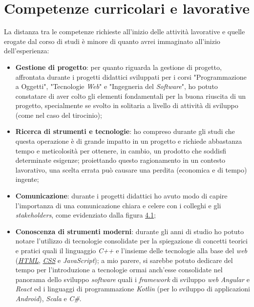 \section{Competenze curricolari e lavorative}
La distanza tra le competenze richieste all'inizio delle attività lavorative e quelle erogate dal corso di studi è minore di quanto avrei immaginato all'inizio dell'esperienza: 
\begin{itemize}
    \item \textbf{Gestione di progetto}: per quanto riguarda la gestione di progetto, affrontata durante i progetti didattici sviluppati per i corsi "Programmazione a Oggetti", "Tecnologie \textit{Web}" e "Ingegneria del \textit{Software}", 
            ho potuto constatare di aver colto gli elementi fondamentali per la buona riuscita di un progetto, specialmente se svolto in solitaria a livello di attività di sviluppo (come nel caso del tirocinio);
    \item \textbf{Ricerca di strumenti e tecnologie}: ho compreso durante gli studi che questa operazione è di grande impatto in un progetto e richiede abbastanza tempo e meticolosità per ottenere, in cambio, un prodotto che soddisfi determinate esigenze; proiettando questo ragionamento in un
            contesto lavorativo, una scelta errata può causare una perdita (economica e di tempo) ingente;
    \item \textbf{Comunicazione}: durante i progetti didattici ho avuto modo di capire l'importanza di una comunicazione chiara e celere con i colleghi e gli \textit{stakeholders}, come evidenziato dalla figura \hyperref[fig:req]{4.1};
    \item \textbf{Conoscenza di strumenti moderni}: durante gli anni di studio ho potuto notare l'utilizzo di tecnologie consolidate per la spiegazione di concetti teorici e pratici quali il linguaggio \textit{C++} e l'insieme delle tecnologie alla base del \textit{web} (\hyperref[subsubsec:html]{\textit{HTML}}, \hyperref[subsubsec:css]{\textit{CSS}} e \textit{JavaScript});
            a mio parere, si sarebbe potuto dedicare del tempo per l'introduzione a tecnologie ormai anch'esse consolidate nel panorama dello sviluppo \textit{software} quali i \textit{framework} di sviluppo \textit{web} \textit{Angular} e \textit{React} ed i linguaggi di programmazione \textit{Kotlin} (per lo sviluppo di applicazioni \textit{Android}), \textit{Scala} e \textit{C\#}.
\end{itemize}